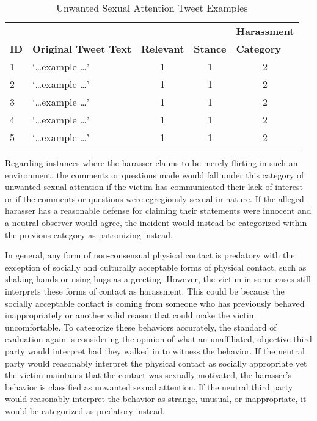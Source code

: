 \begin{table}[H]
    \centering
    \caption{Unwanted Sexual Attention Tweet Examples}
    \begin{tabular}{m{1cm} m{8cm} m{1.5cm} m{1.1cm} m{2.1cm}}
        \toprule
        & {} & {} & {} & {\textbf{Harassment}} \\
        \rowcolor{White}\textbf{ID} & {\textbf{Original Tweet Text}} & {\textbf{Relevant}} & {\textbf{Stance}} & {\textbf{Category}} \\
                \midrule
        1 & `\ldots example \ldots' & \multicolumn{1}{c}{1} & \multicolumn{1}{c}{1} & \multicolumn{1}{c}{2}\\
        2 & `\ldots example \ldots' & \multicolumn{1}{c}{1} & \multicolumn{1}{c}{1} & \multicolumn{1}{c}{2}\\
        3 & `\ldots example \ldots' & \multicolumn{1}{c}{1} & \multicolumn{1}{c}{1} & \multicolumn{1}{c}{2}\\
        4 & `\ldots example \ldots' & \multicolumn{1}{c}{1} & \multicolumn{1}{c}{1} & \multicolumn{1}{c}{2}\\
        5 & `\ldots example \ldots' & \multicolumn{1}{c}{1} & \multicolumn{1}{c}{1} & \multicolumn{1}{c}{2}\\
        \bottomrule
    \end{tabular}
\end{table}

Regarding instances where the harasser claims to be merely flirting in such an environment, the comments or questions made would fall under this category of unwanted sexual attention if the victim has communicated their lack of interest or if the comments or questions were egregiously sexual in nature. If the alleged harasser has a reasonable defense for claiming their statements were innocent and a neutral observer would agree, the incident would instead be categorized within the previous category as patronizing instead.

In general, any form of non-consensual physical contact is predatory with the exception of socially and culturally acceptable forms of physical contact, such as shaking hands or using hugs as a greeting. However, the victim in some cases still interprets these forms of contact as harassment. This could be because the socially acceptable contact is coming from someone who has previously behaved inappropriately or another valid reason that could make the victim uncomfortable. To categorize these behaviors accurately, the standard of evaluation again is considering the opinion of what an unaffiliated, objective third party would interpret had they walked in to witness the behavior. If the neutral party would reasonably interpret the physical contact as socially appropriate yet the victim maintains that the contact was sexually motivated, the harasser's  behavior is classified as unwanted sexual attention. If the neutral third party would reasonably interpret the behavior as strange, unusual, or inappropriate, it would be categorized as predatory instead.

